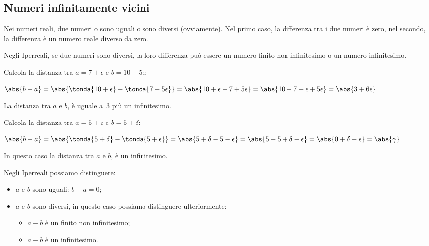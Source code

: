 \begin{esempio}
\begin{enumerate}
\end{enumerate}
\end{esempio}

\subsection{Numeri infinitamente vicini}
\label{subsec:insnum_infinitamentevicini}

Nei numeri reali, due numeri o sono uguali o sono diversi (ovviamente).
Nel primo caso, la differenza tra i due numeri è zero, 
nel secondo, la differenza è un numero reale diverso da zero.

Negli Iperreali, se due numeri sono diversi, la loro differenza può 
essere un numero finito non infinitesimo o un numero infinitesimo.

\begin{esempio}
 Calcola la distanza tra \(a=7+\epsilon\) e \(b=10-5\epsilon\):
 
 \(\abs{b-a}=\abs{\tonda{10+\epsilon} - \tonda{7-5\epsilon}}=
   \abs{10+\epsilon - 7+5\epsilon}=
   \abs{10-7 + \epsilon+5\epsilon}=
   \abs{3 + 6\epsilon}
 \)
 
 La distanza tra \(a\) e \(b\), è uguale a~3 più un infinitesimo.
\end{esempio}

\begin{esempio}
 Calcola la distanza tra \(a=5+\epsilon\) e \(b=5+\delta\):
 
 \(\abs{b-a}=\abs{\tonda{5+\delta} - \tonda{5+\epsilon}}=
   \abs{5+\delta - 5-\epsilon}=
   \abs{5-5 + \delta - \epsilon}=
   \abs{0 + \delta - \epsilon} = \abs{\gamma}
 \)
 
 In questo caso la distanza tra \(a\) e \(b\), è un infinitesimo.
\end{esempio}

\noindent Negli Iperreali possiamo distinguere:

\begin{itemize} [noitemsep]
 \item \(a\) e \(b\) sono uguali: \(b-a=0\);
 \item \(a\) e \(b\) sono diversi, in questo caso possiamo distinguere
 ulteriormente:
\begin{itemize} [nosep]
 \item \(a-b\) è un finito non infinitesimo;
 \item \(a-b\) è un infinitesimo.
\end{itemize}
\end{itemize}

